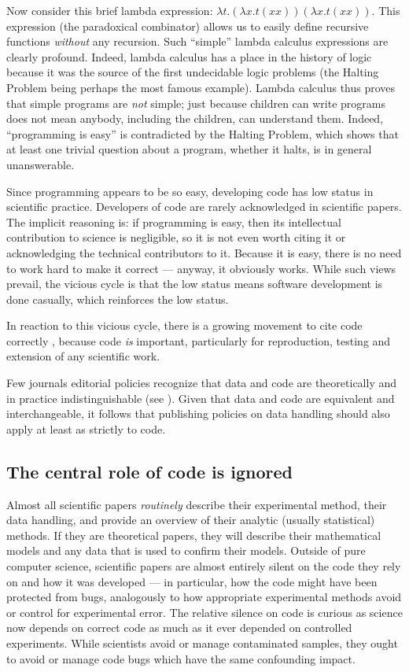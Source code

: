 \documentclass{comjnl}
\begin{document}
Now consider this brief lambda expression: $\lambda t. (\lambda x. t (x x)) (\lambda x. t (x x))$. This expression  (the paradoxical combinator) allows us to easily define recursive functions \emph{without\/} any recursion. Such ``simple'' lambda calculus expressions are clearly profound. Indeed, lambda calculus has a place in the history of logic because it was the source of the first undecidable logic problems (the Halting Problem being perhaps the most famous example). Lambda calculus thus proves that simple programs are \emph{not\/} simple; just because children can write programs does not mean anybody, including the children, can understand them. Indeed, ``programming is easy'' is contradicted by the Halting Problem, which shows that at least one trivial question about a program, whether it halts, is in general unanswerable.

Since programming appears to be so easy, developing code has low status in scientific practice. Developers of code are rarely acknowledged in scientific papers. The implicit reasoning is: if programming is easy, then its intellectual contribution to science is negligible, so it is not even worth citing it or acknowledging the technical contributors to it. Because it is easy, there is no need to work hard to make it correct --- anyway, it obviously works. While such views prevail, the vicious cycle is that the low status means software development is done casually, which reinforces the low status.

In reaction to this vicious cycle, there is a growing movement to cite code correctly \cite{cite-code}, because code \emph{is\/} important, particularly for reproduction, testing and extension of any scientific work. 

Few journals editorial policies recognize that data and code are theoretically and in practice indistinguishable (see \supplement). Given that data and code are equivalent and interchangeable, it follows that publishing policies on data handling should also apply at least as strictly to code.

\subsection{The central role of code is ignored}\label{central-role-of-code}
Almost all scientific papers \emph{routinely\/} describe their experimental method, their data handling, and provide an overview of their analytic (usually statistical) methods. If they are theoretical papers, they will describe their mathematical models and any data that is used to confirm their models. Outside of pure computer science, scientific papers are almost entirely silent on the code they rely on and how it was developed --- in particular, how the code might have been protected from bugs, analogously to how appropriate experimental methods avoid or control for experimental error. The relative silence on code is curious as science now depends on correct code as much as it ever depended on controlled experiments. While scientists avoid or manage contaminated samples, they ought to avoid or manage code bugs which have the same confounding impact.
\end{document}
